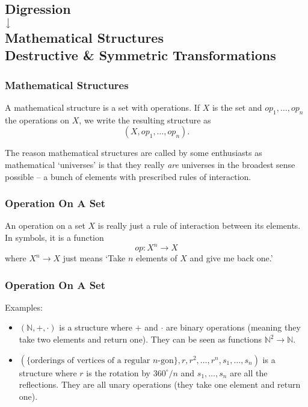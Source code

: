 \documentclass[aspectratio=169,11pt,usenames,dvipsnames]{beamer}
\newcommand{\N}{\mathbb{N}}
\begin{document}
\subsection{Digression\\ $\big\downarrow$\\Mathematical Structures\\ Destructive \&
Symmetric Transformations}

\begin{frame}
 \subsectionpage
\end{frame}

\begin{frame}
 \frametitle{Mathematical Structures}
 \begin{tcolorbox}[title=Mathematical Structure (also `Universe')]
  A \alert{mathematical} structure is a \alert{set} with \alert{operations}. If
  $X$ is the set and $op_1,\ldots,op_n$ the operations on $X$, we write the
  resulting structure as
  \[
   (X,op_1,\ldots,op_n).
  \]
 \end{tcolorbox}
 \pause
 The reason mathematical structures are called by some enthusiasts as
 mathematical `universes' is that they really \emph{are} universes in the
 broadest sense possible -- a bunch of elements with prescribed rules of
 interaction.
\end{frame}

\begin{frame}
 \frametitle{Operation On A Set}
 \begin{tcolorbox}[title=Operation]
  An \alert{operation} on a set $X$ is really just a \alert{rule of
  interaction} between its elements. In symbols, it is a \alert{function}
  \[
   op: X^{n} \to X
  \]
  where $X^{n} \to X$ just means `Take $n$ elements of $X$ and give me back
  one.'
 \end{tcolorbox}
\end{frame}

\begin{frame}
 \frametitle{Operation On A Set}
 \alert{Examples:}
 \begin{itemize}
  \item $(\N,+, \cdot )$ is a structure where $+$ and $ \cdot $ are
   \alert{binary} operations (meaning they take two elements and return one).
   They can be seen as functions $\N^2 \to \N$.\pause
  \item $(\{\text{orderings of vertices of a regular $n$-gon}\}, r,
   r^{2},\ldots, r^{n}, s_1,\ldots,s_n)$ is a structure where $r$ is the
   rotation by $360^{ \circ } / n$ and $s_1,\ldots,s_n$ are all the reflections.
   They are all \alert{unary} operations (they take one element and return one).
 \end{itemize}
\end{frame}
\end{document}
